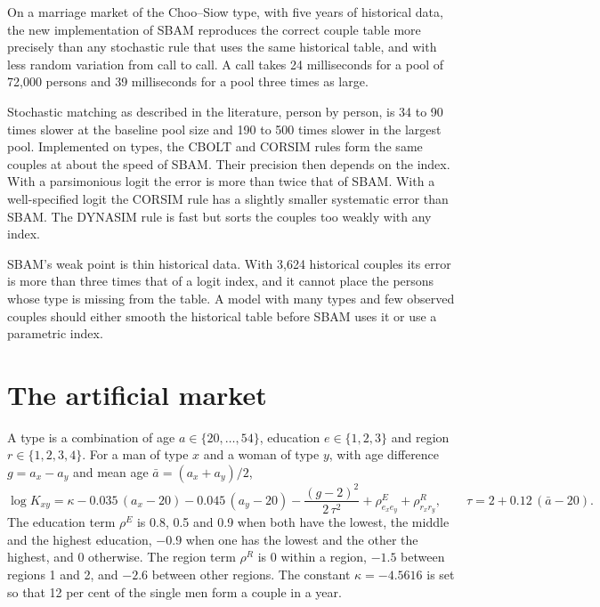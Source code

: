 \documentclass[12pt,a4paper]{article}
\begin{document}
On a marriage market of the Choo--Siow type, with five years of historical data, the new
implementation of SBAM reproduces the correct couple table more precisely than any stochastic
rule that uses the same historical table, and with less random variation from call to call. A
call takes 24 milliseconds for a pool of 72,000 persons and 39 milliseconds for a pool three
times as large.

Stochastic matching as described in the literature, person by person, is 34 to 90 times slower
at the baseline pool size and 190 to 500 times slower in the largest pool. Implemented on
types, the CBOLT and CORSIM rules form the same couples at about the speed of SBAM. Their
precision then depends on the index. With a parsimonious logit the error is more than twice that
of SBAM. With a well-specified logit the CORSIM rule has a slightly smaller systematic error
than SBAM. The DYNASIM rule is fast but sorts the couples too weakly with any index.

SBAM's weak point is thin historical data. With 3,624 historical couples its error is more than
three times that of a logit index, and it cannot place the persons whose type is missing from
the table. A
model with many types and few observed couples should either smooth the historical table before
SBAM uses it or use a parametric index.

\appendix

\section{The artificial market}\label{app:market}

A type is a combination of age $a \in \{20,\dots,54\}$, education $e \in \{1,2,3\}$ and region
$r \in \{1,2,3,4\}$. For a man of type $x$ and a woman of type $y$, with age difference
$g = a_x - a_y$ and mean age $\bar{a} = (a_x + a_y)/2$,
\begin{equation*}
\log K_{xy} = \kappa - 0.035\,(a_x - 20) - 0.045\,(a_y - 20) - \frac{(g-2)^2}{2\,\tau^2}
  + \rho^E_{e_x e_y} + \rho^R_{r_x r_y}, \qquad \tau = 2 + 0.12\,(\bar{a} - 20).
\end{equation*}
The education term $\rho^E$ is 0.8, 0.5 and 0.9 when both have the lowest, the middle and the
highest education, $-0.9$ when one has the lowest and the other the highest, and 0 otherwise. The
region term $\rho^R$ is 0 within a region, $-1.5$ between regions 1 and 2, and $-2.6$ between
other regions. The constant $\kappa = -4.5616$ is set so that 12 per cent of the single men form
a couple in a year.
\end{document}
